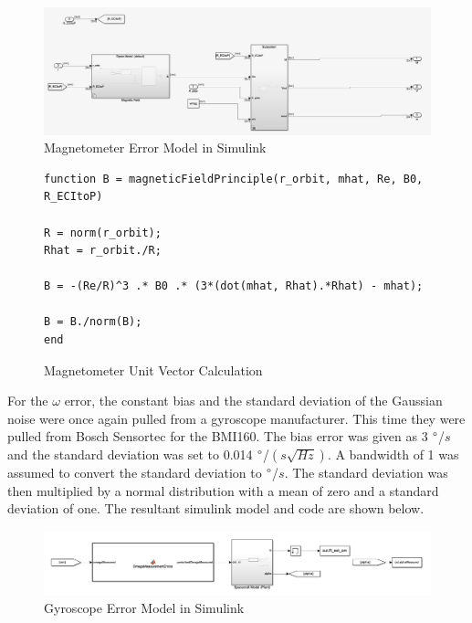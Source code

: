 \begin{figure}[H]
    \centering
    \captionsetup{ justification = centering }
    \includegraphics[width = 15cm]{Images/PS7/magnetometerErrorSimulink.png}
    \caption{Magnetometer Error Model in Simulink}
    \label{fig:magnetometerErrorSimulink}
\end{figure}

\begin{figure} [H]
    \centering
    \begin{lstlisting}
function B = magneticFieldPrinciple(r_orbit, mhat, Re, B0, R_ECItoP)

R = norm(r_orbit);
Rhat = r_orbit./R;

B = -(Re/R)^3 .* B0 .* (3*(dot(mhat, Rhat).*Rhat) - mhat);

B = B./norm(B);
end
    \end{lstlisting}
    \caption{Magnetometer Unit Vector Calculation}
    \label{fig:magnetometerNoise}
\end{figure}

For the $\omega$ error, the constant bias and the standard deviation of the Gaussian noise were once again pulled from a gyroscope manufacturer. This time they were pulled from Bosch Sensortec for the BMI160. The bias error was given as 3 $\degree$/$s$ and the standard deviation was set to  0.014 $\degree$/$\left(s \sqrt{Hz}\right)$. A bandwidth of 1 was assumed to convert the standard deviation to $\degree$/$s$. The standard deviation was then multiplied by a normal distribution with a mean of zero and a standard deviation of one. The resultant simulink model and code are shown below.

\begin{figure}[H]
    \centering
    \captionsetup{ justification = centering }
    \includegraphics[width = 15cm]{Images/PS7/GyroErrorSimulink.png}
    \caption{Gyroscope Error Model in Simulink}
    \label{fig:gyroErrorSimulink}
\end{figure}

